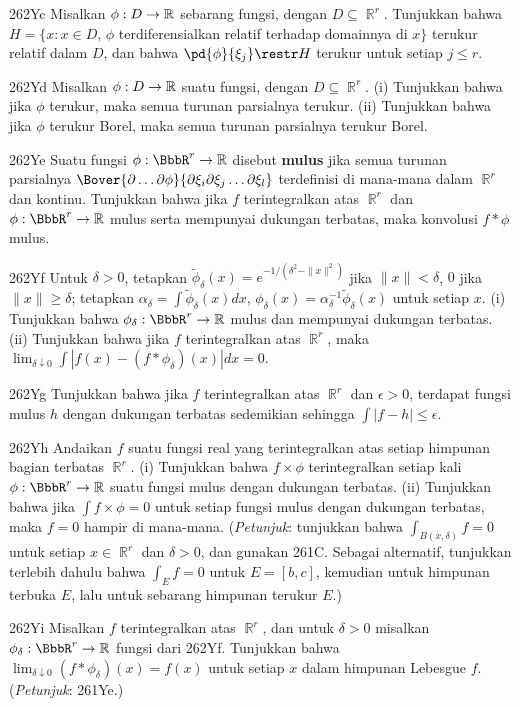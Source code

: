 {\spheader 262Yc Misalkan $\phi:D\to\Bbb R$ sebarang fungsi, dengan
$D\subseteq\BbbR^r$. Tunjukkan bahwa
$H=\{x:x\in D,\,\phi$ terdiferensialkan relatif terhadap domainnya di
$x\}$ terukur relatif dalam $D$, dan bahwa $\pd{\phi}{\xi_j}\restr H$
terukur untuk setiap $j\le r$.

\spheader 262Yd
Misalkan $\phi:D\to\Bbb R$ suatu fungsi, dengan
$D\subseteq\BbbR^r$.
(i) Tunjukkan bahwa jika $\phi$ terukur, maka semua turunan parsialnya
terukur.
(ii) Tunjukkan bahwa jika $\phi$ terukur Borel, maka semua turunan
parsialnya terukur Borel.

\spheader 262Ye Suatu fungsi $\phi:\BbbR^r\to\Bbb R$ disebut
{\bf mulus} jika semua turunan parsialnya
$\Bover{\partial\ldots\partial\phi}
{\partial\xi_i\partial\xi_j\ldots\partial\xi_l}$ terdefinisi di mana-mana
dalam $\BbbR^r$ dan kontinu. Tunjukkan bahwa jika $f$ terintegralkan atas
$\BbbR^r$ dan $\phi:\BbbR^r\to\Bbb R$ mulus serta mempunyai dukungan
terbatas, maka konvolusi $f*\phi$ mulus. 

\spheader 262Yf Untuk $\delta>0$, tetapkan
$\tilde\phi_{\delta}(x) =e^{-1/(\delta^2-\|x\|^2)}$ jika $\|x\|<\delta$,
$0$ jika $\|x\|\ge\delta$; tetapkan
$\alpha_{\delta}=\int\tilde\phi_{\delta}(x)dx$,
$\phi_{\delta}(x)=\alpha_{\delta}^{-1}\tilde\phi_{\delta}(x)$ untuk setiap
$x$. (i) Tunjukkan bahwa $\phi_{\delta}:\BbbR^r\to\Bbb R$ mulus dan
mempunyai dukungan terbatas. (ii) Tunjukkan bahwa jika $f$ terintegralkan
atas $\BbbR^r$, maka
$\lim_{\delta\downarrow 0}\int|f(x)-(f*\phi_{\delta})(x)|dx=0$.

\spheader 262Yg Tunjukkan bahwa jika $f$ terintegralkan atas $\BbbR^r$
dan $\epsilon>0$, terdapat fungsi mulus $h$ dengan dukungan terbatas
sedemikian sehingga $\int|f-h|\le\epsilon$.

\spheader 262Yh Andaikan $f$ suatu fungsi real yang terintegralkan atas
setiap himpunan bagian terbatas $\BbbR^r$. (i) Tunjukkan bahwa
$f\times\phi$ terintegralkan setiap kali $\phi:\BbbR^r\to\Bbb R$ suatu
fungsi mulus dengan dukungan terbatas. (ii) Tunjukkan bahwa jika
$\int f\times\phi=0$ untuk setiap fungsi mulus dengan dukungan terbatas,
maka $f=0$ hampir di mana-mana. ({\it Petunjuk\/}: tunjukkan bahwa
$\int_{B(x,\delta)}f=0$ untuk setiap $x\in\BbbR^r$ dan $\delta>0$, dan
gunakan 261C. Sebagai alternatif, tunjukkan terlebih dahulu bahwa
$\int_Ef=0$ untuk $E=[b,c]$, kemudian untuk himpunan terbuka $E$, lalu
untuk sebarang himpunan terukur $E$.)

\spheader 262Yi Misalkan $f$ terintegralkan atas $\BbbR^r$, dan untuk
$\delta>0$ misalkan $\phi_{\delta}:\BbbR^r\to\Bbb R$ fungsi dari 262Yf.
Tunjukkan bahwa $\lim_{\delta\downarrow 0}(f*\phi_{\delta})(x)=f(x)$
untuk setiap $x$ dalam himpunan Lebesgue $f$. ({\it Petunjuk\/}: 261Ye.)

}%

